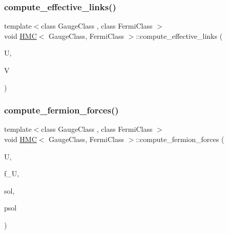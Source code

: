 \subsubsection{\texorpdfstring{compute\+\_\+effective\+\_\+links()}{compute\_effective\_links()}}
{\footnotesize\ttfamily template$<$class Gauge\+Class , class Fermi\+Class $>$ \\
void \hyperlink{class_h_m_c}{H\+MC}$<$ Gauge\+Class, Fermi\+Class $>$\+::compute\+\_\+effective\+\_\+links (\begin{DoxyParamCaption}\item[{Gauge\+Class \&}]{U,  }\item[{Gauge\+Class \&}]{V }\end{DoxyParamCaption})\hspace{0.3cm}{\ttfamily [inline]}}

\mbox{\label{class_h_m_c_a2e84b43878a9162a4370c6272f7db6ac}} 
\subsubsection{\texorpdfstring{compute\+\_\+fermion\+\_\+forces()}{compute\_fermion\_forces()}}
{\footnotesize\ttfamily template$<$class Gauge\+Class , class Fermi\+Class $>$ \\
void \hyperlink{class_h_m_c}{H\+MC}$<$ Gauge\+Class, Fermi\+Class $>$\+::compute\+\_\+fermion\+\_\+forces (\begin{DoxyParamCaption}\item[{Gauge\+Class \&}]{U,  }\item[{Gauge\+Class \&}]{f\+\_\+U,  }\item[{Fermi\+Class \&}]{sol,  }\item[{Fermi\+Class \&}]{psol }\end{DoxyParamCaption})\hspace{0.3cm}{\ttfamily [inline]}}

\mbox{\label{class_h_m_c_aa91216c67c4304558aa47b9011abb9d2}} 
